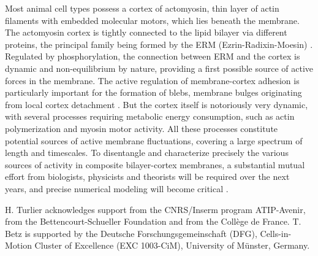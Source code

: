 \documentclass[graybox]{svmult}
\begin{document}
Most animal cell types possess a cortex of actomyosin, thin layer of actin filaments with embedded molecular motors, which lies beneath the membrane. The actomyosin cortex is tightly connected to the lipid bilayer via different proteins, the principal family being formed by the ERM (Ezrin-Radixin-Moesin) \cite{Fehon:2010}. Regulated by phosphorylation, the connection between ERM and the cortex is dynamic and non-equilibrium by nature, providing a first possible source of active forces in the membrane. The active regulation of membrane-cortex adhesion is particularly important for the formation of blebs, membrane bulges originating from local cortex detachment \cite{Charras:2008,Peukes:2014,Alert:2016}. But the cortex itself is notoriously very dynamic, with several processes requiring metabolic energy consumption, such as actin polymerization and myosin motor activity. All these processes constitute potential sources of active membrane fluctuations, covering a large spectrum of length and timescales. To disentangle and characterize precisely the various sources of activity in composite bilayer-cortex membranes, a substantial mutual effort from biologists, physicists and theorists will be required over the next years, and precise numerical modeling will become critical \cite{Turlier:2016,Fedosov:2010}.



\begin{acknowledgement}
H. Turlier acknowledges support from the CNRS/Inserm program ATIP-Avenir, from the Bettencourt-Schueller Foundation and from the Coll\`{e}ge de France.
T. Betz is supported by the Deutsche Forschungsgemeinschaft (DFG), Cells-in-Motion Cluster of Excellence (EXC 1003-CiM), University of M\"{u}nster, Germany. 
\end{acknowledgement}
%

%
\end{document}
